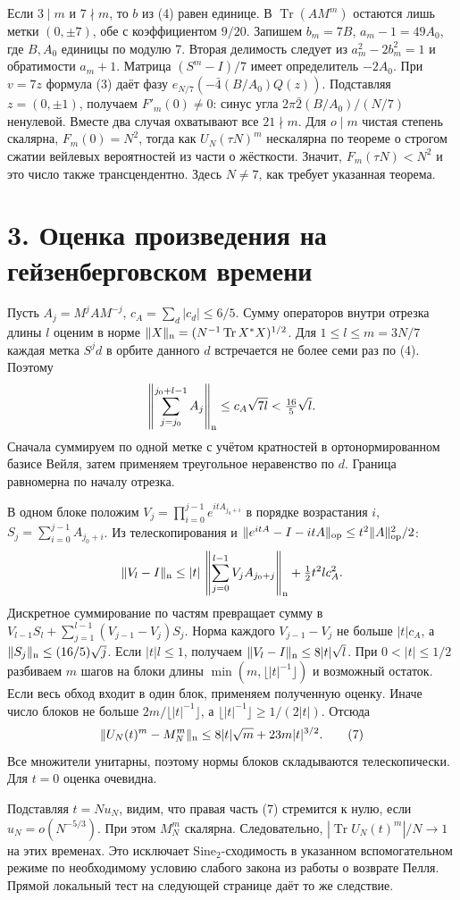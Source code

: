 \documentclass[11pt,a4paper]{article}
\newcommand{\Tr}{\operatorname{Tr}}
\newcommand{\si}{\mathrm{Sine}_2}
\newcommand{\sect}[1]{\section*{\sffamily\color{ink}#1}}
\begin{document}
Если $3\mid m$ и $7\nmid m$, то $b$ из (4) равен единице. В $\Tr(A M^m)$ остаются лишь метки $(0,\pm7)$, обе с коэффициентом $9/20$. Запишем $b_m=7B$, $a_m-1=49A_0$, где $B,A_0$ единицы по модулю 7. Вторая делимость следует из $a_m^2-2b_m^2=1$ и обратимости $a_m+1$. Матрица $(S^m-I)/7$ имеет определитель $-2A_0$. При $v=7z$ формула (3) даёт фазу $e_{N/7}(-\bar4(B/A_0)Q(z))$. Подставляя $z=(0,\pm1)$, получаем $F'_m(0)\ne0$: синус угла $2\pi\bar2(B/A_0)/(N/7)$ ненулевой. Вместе два случая охватывают все $21\nmid m$. Для $o\mid m$ чистая степень скалярна, $F_m(0)=N^2$, тогда как $U_N(\tau N)^m$ нескалярна по теореме о строгом сжатии вейлевых вероятностей из части о жёсткости. Значит, $F_m(\tau N)<N^2$ и это число также трансцендентно. Здесь $N\ne7$, как требует указанная теорема.
\newpage
\sect{3. Оценка произведения на гейзенберговском времени}
Пусть $A_j=M^j A M^{-j}$, $c_A=\sum_d |c_d|\le6/5$. Сумму операторов внутри отрезка длины $l$ оценим в норме $\|X\|_{\rm n}=(N^{-1}\Tr X^*X)^{1/2}$. Для $1\le l\le m=3N/7$ каждая метка $S^j d$ в орбите данного $d$ встречается не более семи раз по (4). Поэтому
\[
 \left\|\sum_{j=j_0}^{j_0+l-1} A_j\right\|_{\rm n}
   \le c_A\sqrt{7l}<\tfrac{16}{5}\sqrt l .
\]
Сначала суммируем по одной метке с учётом кратностей в ортонормированном базисе Вейля, затем применяем треугольное неравенство по $d$. Граница равномерна по началу отрезка.

В одном блоке положим $V_j=\prod_{i=0}^{j-1}e^{itA_{j_0+i}}$ в порядке возрастания $i$, $S_j=\sum_{i=0}^{j-1}A_{j_0+i}$. Из телескопирования и $\|e^{it A}-I-it A\|_{\rm op}\le t^2\|A\|_{\rm op}^2/2$:
\[
 \|V_l-I\|_{\rm n}\le |t|\,\left\|\sum_{j=0}^{l-1}V_j A_{j_0+j}\right\|_{\rm n}
                             +\tfrac12 t^2 l c_A^2 .
\]
Дискретное суммирование по частям превращает сумму в $V_{l-1}S_l+\sum_{j=1}^{l-1}(V_{j-1}-V_j)S_j$. Норма каждого $V_{j-1}-V_j$ не больше $|t|c_A$, а $\|S_j\|_{\rm n}\le(16/5)\sqrt j$. Если $|t|l\le1$, получаем $\|V_l-I\|_{\rm n}\le8|t|\sqrt l$. При $0<|t|\le1/2$ разбиваем $m$ шагов на блоки длины $\min(m,\lfloor |t|^{-1}\rfloor)$ и возможный остаток. Если весь обход входит в один блок, применяем полученную оценку. Иначе число блоков не больше $2m/\lfloor |t|^{-1}\rfloor$, а $\lfloor |t|^{-1}\rfloor\ge 1/(2|t|)$. Отсюда
\[
 \|U_N(t)^m-M_N^m\|_{\rm n}
                       \le 8 |t|\sqrt m+23 m|t|^{3/2}.             \tag{7}
\]
Все множители унитарны, поэтому нормы блоков складываются телескопически. Для $t=0$ оценка очевидна.

Подставляя $t=Nu_N$, видим, что правая часть (7) стремится к нулю, если $u_N=o(N^{-5/3})$. При этом $M_N^m$ скалярна. Следовательно, $|\Tr U_N(t)^m|/N\to1$ на этих временах. Это исключает $\si$-сходимость в указанном вспомогательном режиме по необходимому условию слабого закона из работы о возврате Пелля. Прямой локальный тест на следующей странице даёт то же следствие.
\end{document}
